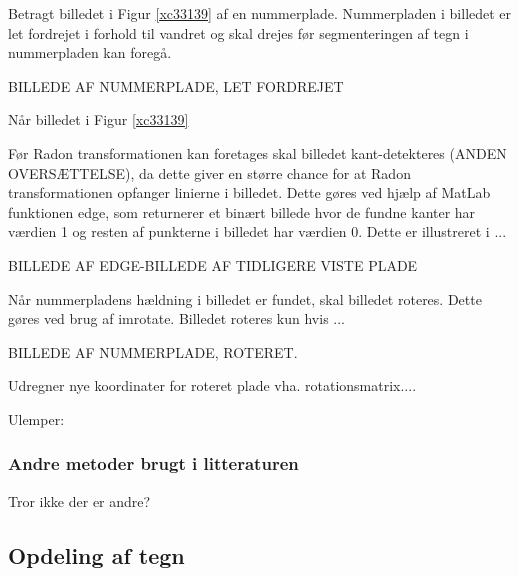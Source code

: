 
Betragt billedet i Figur \ref{xc33139} af en nummerplade. Nummerpladen i billedet er let fordrejet i forhold til vandret og skal drejes før segmenteringen af tegn i nummerpladen kan foregå.

BILLEDE AF NUMMERPLADE, LET FORDREJET


Når billedet i Figur \ref{xc33139}

Før Radon transformationen kan foretages skal billedet kant-detekteres (ANDEN OVERSÆTTELSE), da dette giver en større chance for at Radon transformationen opfanger linierne i billedet. Dette gøres ved hjælp af MatLab funktionen edge, som returnerer et binært billede hvor de fundne kanter har værdien 1 og resten af punkterne i billedet har værdien 0. Dette er illustreret i ...

BILLEDE AF EDGE-BILLEDE AF TIDLIGERE VISTE PLADE


Når nummerpladens hældning i billedet er fundet, skal billedet roteres. Dette gøres ved brug af imrotate. Billedet roteres kun hvis ...

BILLEDE AF NUMMERPLADE, ROTERET.

Udregner nye koordinater for roteret plade vha. rotationsmatrix....

Ulemper:

\subsubsection*{Andre metoder brugt i litteraturen}

Tror ikke der er andre?

\subsection{Opdeling af tegn}

